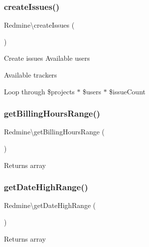 \subsubsection{\texorpdfstring{create\+Issues()}{createIssues()}}
{\footnotesize\ttfamily Redmine\textbackslash{}create\+Issues (\begin{DoxyParamCaption}{ }\end{DoxyParamCaption})}

Create issues Available users

Available trackers

Loop through \$projects $\ast$ \$users $\ast$ \$issue\+Count\mbox{\label{namespace_redmine_a1ac3a8bc207665303d677efdbbe45668}} 
\subsubsection{\texorpdfstring{get\+Billing\+Hours\+Range()}{getBillingHoursRange()}}
{\footnotesize\ttfamily Redmine\textbackslash{}get\+Billing\+Hours\+Range (\begin{DoxyParamCaption}{ }\end{DoxyParamCaption})}

\begin{DoxyReturn}{Returns}
array 
\end{DoxyReturn}
\mbox{\label{namespace_redmine_aae8f12afa6eb411d71171213f322e09b}} 
\subsubsection{\texorpdfstring{get\+Date\+High\+Range()}{getDateHighRange()}}
{\footnotesize\ttfamily Redmine\textbackslash{}get\+Date\+High\+Range (\begin{DoxyParamCaption}{ }\end{DoxyParamCaption})}

\begin{DoxyReturn}{Returns}
array 
\end{DoxyReturn}
\mbox{\label{namespace_redmine_aeb2a8ae7b82a8383551d30e21314931c}} 
